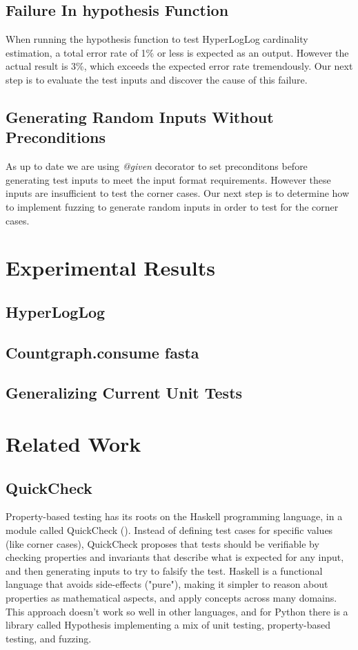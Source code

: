 \documentclass[preprint,nocopyrightspace]{sig-alternate}
\begin{document}
\subsection{Failure In hypothesis Function}
When running the hypothesis function to test HyperLogLog cardinality estimation, 
a total error rate of 1\% or less is expected as an output. 
However the actual result is 3\%, 
which exceeds the expected error rate tremendously. 
Our next step is to evaluate the test inputs and discover the cause of this failure.

\subsection{Generating Random Inputs Without Preconditions}
As up to date we are using \emph{@given} decorator to set preconditons before generating test inputs to meet the input format requirements. 
However these inputs are insufficient to test the corner cases. 
Our next step is to determine how to implement fuzzing to generate random inputs in order to test for the corner cases.

\section{Experimental Results}

\subsection{HyperLogLog}

\subsection{Countgraph.consume fasta}

\subsection{Generalizing Current Unit Tests}

\section{Related Work}

\subsection{QuickCheck}
Property-based testing has its roots on the Haskell programming language,
in a module called QuickCheck (\citet{claessen_quickcheck:_2011}).
Instead of defining test cases for specific values (like corner cases),
QuickCheck proposes that tests should be verifiable by checking properties and invariants that describe what is expected for any input,
and then generating inputs to try to falsify the test.
Haskell is a functional language that avoids side-effects ("pure"),
making it simpler to reason about properties as mathematical aspects,
and apply concepts across many domains.
This approach doesn't work so well in other languages,
and for Python there is a library called Hypothesis implementing a mix of unit testing,
property-based testing,
and fuzzing.
\end{document}
